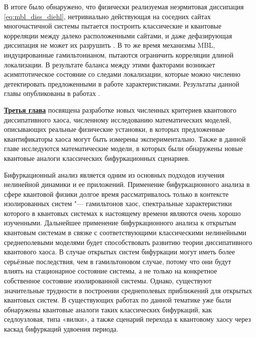 В итоге было обнаружено, что физически реализуемая неэрмитовая диссипация \cref{eq:mbl_diss_diehl}, нетривиально действующая на соседних сайтах многочастичной системы пытается построить классические и квантовые корреляции между далеко расположенными сайтами, и даже дефазирующая диссипация не может их разрушить \cite{Vakulchyk2018}. 
В то же время механизмы MBL, индуцированные гамильтонианом, пытаются ограничить корреляции длиной локализации. 
В результате баланса между этими факторами возникает асимптотическое состояние со следами локализации, которые можно численно детектировать предложенными в работе характеристиками.  
Результаты данной главы опубликованы в работах \cite{Yusipov2017, Vershinina2017, Yusipov2018, Vakulchyk2018, sessiann_2017, rf_2017, shilnikov_2017}.


\underline{\textbf{Третья глава}} посвящена разработке новых численных критериев квантового диссипативного хаоса, численному исследованию математических моделей, описывающих реальные физические установки, в которых предложенные квантификаторы хаоса могут быть измерены экспериментально. 
Также в данной главе исследуются математические модели, в которых были обнаружены новые квантовые аналоги классических бифуркационных сценариев.

Бифуркационный анализ является одним из основных подходов изучения нелинейной динамики и ее приложений.
Применение бифуркационного анализа в сфере квантовой физики долгое время рассматривалось только в контексте изолированных систем  "---  гамильтонов хаос, спектральные характеристики которого в квантовых системах к настоящему времени являются очень хорошо изученными.
Дальнейшее применение бифуркационного анализа к открытым квантовым системам в связке с соответствующими классическими нелинейными среднеполевыми моделями будет способствовать развитию теории диссипативного квантового хаоса. 
В случае открытых систем бифуркации могут иметь более серьёзные последствия, чем в гамильтоновом случае, потому что они будут влиять на стационарное состояние системы, а не только на конкретное собственное состояние изолированной системы.
Однако, существуют значительные трудности в построении среднеполевых приближений для открытых квантовых систем.
В существующих работах по данной тематике уже были обнаружены квантовые аналоги таких классических бифуркаций, как седлоузловая, типа «вилки», а также сценарий перехода к квантовому хаосу через каскад бифуркаций удвоения периода.

